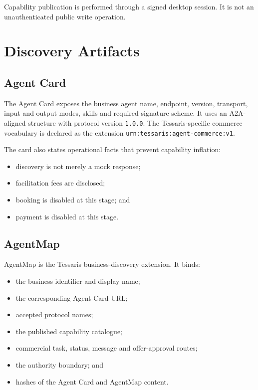 \documentclass[11pt,a4paper]{article}
\newcommand{\code}[1]{\texttt{#1}}
\begin{document}
Capability publication is performed through a signed desktop session.  It is
not an unauthenticated public write operation.

\section{Discovery Artifacts}

\subsection{Agent Card}

The Agent Card exposes the business agent name, endpoint, version, transport,
input and output modes, skills and required signature scheme.  It uses an
A2A-aligned structure with protocol version \code{1.0.0}.  The Tessaris-specific
commerce vocabulary is declared as the extension
\code{urn:tessaris:agent-commerce:v1}.

The card also states operational facts that prevent capability inflation:

\begin{itemize}
  \item discovery is not merely a mock response;
  \item facilitation fees are disclosed;
  \item booking is disabled at this stage; and
  \item payment is disabled at this stage.
\end{itemize}

\subsection{AgentMap}

AgentMap is the Tessaris business-discovery extension.  It binds:

\begin{itemize}
  \item the business identifier and display name;
  \item the corresponding Agent Card URL;
  \item accepted protocol names;
  \item the published capability catalogue;
  \item commercial task, status, message and offer-approval routes;
  \item the authority boundary; and
  \item hashes of the Agent Card and AgentMap content.
\end{itemize}
\end{document}
